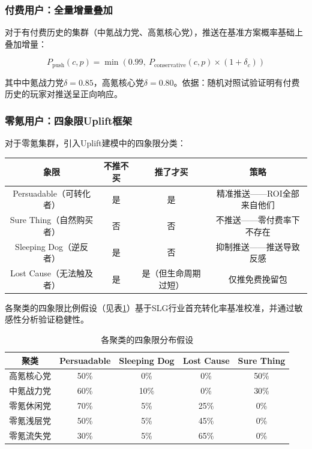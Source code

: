 \subsubsection{付费用户：全量增量叠加}

对于有付费历史的集群（中氪战力党、高氪核心党），推送在基准方案概率基础上叠加增量：

\begin{equation}
P_{\text{push}}(c, p) = \min\left(0.99,\ P_{\text{conservative}}(c, p) \times (1 + \delta_c)\right)
\end{equation}

其中中氪战力党$\delta=0.85$，高氪核心党$\delta=0.80$。依据：随机对照试验\cite{ascarza2025}证明有付费历史的玩家对推送呈正向响应。

\subsubsection{零氪用户：四象限Uplift框架}

对于零氪集群，引入Uplift建模中的四象限分类\cite{wei2024}：

\begin{center}
\begin{tabular}{c|c|c|c}
\toprule
\textbf{象限} & \textbf{不推不买} & \textbf{推了才买} & \textbf{策略} \\
\midrule
Persuadable（可转化者）& 是 & 是 & 精准推送——ROI全部来自他们 \\
Sure Thing（自然购买者）& 否 & 否 & 不推送——零付费率下不存在 \\
Sleeping Dog（逆反者）& 是 & 否 & 抑制推送——推送导致反感 \\
Lost Cause（无法触及者）& 是 & 是（但生命周期过短）& 仅推免费挽留包 \\
\bottomrule
\end{tabular}
\end{center}

各聚类的四象限比例假设（见表\ref{tab:quadrants}）基于SLG行业首充转化率基准校准，并通过敏感性分析验证稳健性。

\begin{table}[H]
\centering
\caption{各聚类的四象限分布假设}
\label{tab:quadrants}
\small
\begin{tabular}{c|c|c|c|c}
\toprule
\textbf{聚类} & \textbf{Persuadable} & \textbf{Sleeping Dog} & \textbf{Lost Cause} & \textbf{Sure Thing} \\
\midrule
高氪核心党 & 50\% & 0\% & 0\% & 50\% \\
中氪战力党 & 60\% & 10\% & 0\% & 30\% \\
零氪休闲党 & 70\% & 5\% & 25\% & 0\% \\
零氪浅层党 & 50\% & 5\% & 45\% & 0\% \\
零氪流失党 & 30\% & 5\% & 65\% & 0\% \\
\bottomrule
\end{tabular}
\end{table}

